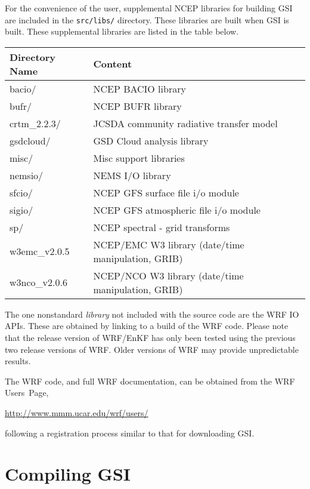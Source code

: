 For the convenience of the user, supplemental NCEP libraries for building GSI are 
included in the \verb|src/libs/| directory. These libraries are built when GSI is built. 
These supplemental libraries are listed in the table below.

\begin{table}[htbp]
\centering
\begin{tabular}{| l | l |}
\hline
\hline
Directory Name &  Content \\
\hline
bacio/  &  NCEP BACIO library  \\
\hline
bufr/   &  NCEP BUFR library  \\
\hline
crtm\_2.2.3/ &  JCSDA community radiative transfer model  \\
\hline
gsdcloud/   &  GSD Cloud analysis library  \\
\hline
misc/     &  Misc support libraries  \\
\hline
nemsio/  &  NEMS I/O library  \\
\hline
sfcio/  &  NCEP GFS surface file i/o module  \\
\hline
sigio/ &  NCEP GFS atmospheric file i/o module \\
\hline
sp/ &  NCEP spectral - grid transforms \\
\hline
w3emc\_v2.0.5   &  NCEP/EMC W3 library (date/time manipulation, GRIB) \\
\hline
w3nco\_v2.0.6  & NCEP/NCO W3 library (date/time manipulation, GRIB)  \\
\hline

\end{tabular}
\label{ch2_tble2}
\end{table} 

The one nonstandard \textit{library} not included with the source code are the WRF IO API\textquotesingle s. These are obtained by linking to a build of the WRF code. Please note that the release version of WRF/EnKF has only been tested using the previous two release versions of WRF. Older versions of WRF may provide unpredictable results.

The WRF code, and full WRF documentation, can be obtained from the WRF Users\textquotesingle \ Page,

\url{http://www.mmm.ucar.edu/wrf/users/}

following a registration process similar to that for downloading GSI.

\section{Compiling GSI} \label{ch2_compiling}


